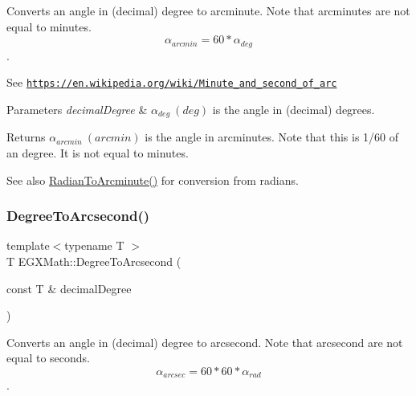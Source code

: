 Converts an angle in (decimal) degree to arcminute. Note that arcminutes are not equal to minutes. \[\alpha_{arcmin}= 60 * \alpha_{deg}\]. 

See \href{https://en.wikipedia.org/wiki/Minute_and_second_of_arc}{\tt https\+://en.\+wikipedia.\+org/wiki/\+Minute\+\_\+and\+\_\+second\+\_\+of\+\_\+arc} 
\begin{DoxyParams}{Parameters}
{\em decimal\+Degree} & $\alpha_{deg}\ (deg)$ is the angle in (decimal) degrees. \\
\hline
\end{DoxyParams}
\begin{DoxyReturn}{Returns}
$\alpha_{arcmin}\ (arcmin)$ is the angle in arcminutes. Note that this is 1/60 of an degree. It is not equal to minutes. 
\end{DoxyReturn}
\begin{DoxySeeAlso}{See also}
\mbox{\hyperlink{group___e_g_x_math-_angle_conversions-_radian_ga722e3b8e78540a6b3942b73b64aeb8d2}{Radian\+To\+Arcminute()}} for conversion from radians. 
\end{DoxySeeAlso}
\mbox{\label{group___e_g_x_math-_angle_conversions-_degree_gaf85e2d765c248f447854a807a68a5de8}} 
\subsubsection{\texorpdfstring{Degree\+To\+Arcsecond()}{DegreeToArcsecond()}}
{\footnotesize\ttfamily template$<$typename T $>$ \\
T E\+G\+X\+Math\+::\+Degree\+To\+Arcsecond (\begin{DoxyParamCaption}\item[{const T \&}]{decimal\+Degree }\end{DoxyParamCaption})}



Converts an angle in (decimal) degree to arcsecond. Note that arcsecond are not equal to seconds. \[\alpha_{arcsec}=60 * 60 * \alpha_{rad}\]. 


